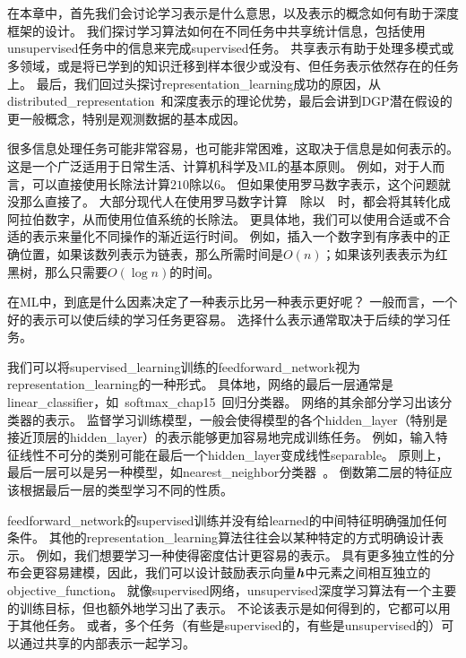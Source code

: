 \chapter{}
\label{chap:representation_learning}


在本章中，首先我们会讨论学习表示是什么意思，以及表示的概念如何有助于深度框架的设计。
我们探讨学习算法如何在不同任务中共享统计信息，包括使用\gls{unsupervised}任务中的信息来完成\gls{supervised}任务。
共享表示有助于处理多模式或多领域，或是将已学到的知识迁移到样本很少或没有、但任务表示依然存在的任务上。
最后，我们回过头探讨\gls{representation_learning}成功的原因，从\gls{distributed_representation}~\citep{Hinton-et-al-PDP1986}和深度表示的理论优势，最后会讲到\gls{DGP}潜在假设的更一般概念，特别是观测数据的基本成因。


很多信息处理任务可能非常容易，也可能非常困难，这取决于信息是如何表示的。
这是一个广泛适用于日常生活、计算机科学及\gls{ML}的基本原则。
例如，对于人而言，可以直接使用长除法计算$210$除以$6$。
但如果使用罗马数字表示，这个问题就没那么直接了。
大部分现代人在使用罗马数字计算~~除以~~时，都会将其转化成阿拉伯数字，从而使用位值系统的长除法。
更具体地，我们可以使用合适或不合适的表示来量化不同操作的渐近运行时间。
例如，插入一个数字到有序表中的正确位置，如果该数列表示为链表，那么所需时间是$O(n)$；如果该列表表示为红黑树，那么只需要$O(\log n)$的时间。


在\gls{ML}中，到底是什么因素决定了一种表示比另一种表示更好呢？
一般而言，一个好的表示可以使后续的学习任务更容易。
选择什么表示通常取决于后续的学习任务。



我们可以将\gls{supervised_learning}训练的\gls{feedforward_network}视为\gls{representation_learning}的一种形式。
具体地，网络的最后一层通常是\gls{linear_classifier}，如~\gls{softmax_chap15}~回归分类器。
网络的其余部分学习出该分类器的表示。
监督学习训练模型，一般会使得模型的各个\gls{hidden_layer}（特别是接近顶层的\gls{hidden_layer}）的表示能够更加容易地完成训练任务。
例如，输入特征线性不可分的类别可能在最后一个\gls{hidden_layer}变成线性\gls{separable}。
原则上，最后一层可以是另一种模型，如\gls{nearest_neighbor}分类器~\citep{SalakhutdinovR2007-small}。
倒数第二层的特征应该根据最后一层的类型学习不同的性质。


\gls{feedforward_network}的\gls{supervised}训练并没有给\gls{learned}的中间特征明确强加任何条件。
其他的\gls{representation_learning}算法往往会以某种特定的方式明确设计表示。
例如，我们想要学习一种使得密度估计更容易的表示。
具有更多独立性的分布会更容易建模，因此，我们可以设计鼓励表示向量$\boldsymbol{\mathit{h}}$中元素之间相互独立的\gls{objective_function}。
就像\gls{supervised}网络，\gls{unsupervised}深度学习算法有一个主要的训练目标，但也额外地学习出了表示。
不论该表示是如何得到的，它都可以用于其他任务。
或者，多个任务（有些是\gls{supervised}的，有些是\gls{unsupervised}的）可以通过共享的内部表示一起学习。


